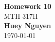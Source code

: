 \begin{titlepage}
    \begin{center}
        {\fontsize{40}{48}\selectfont \bfseries Homework 10}
        \\\vspace{20pt}
        {\LARGE MTH 317H} \\
        \vspace{20pt}
        \textbf{Huey Nguyen}
        \vspace{8pt}
        \\\today
    \end{center}
\end{titlepage}
